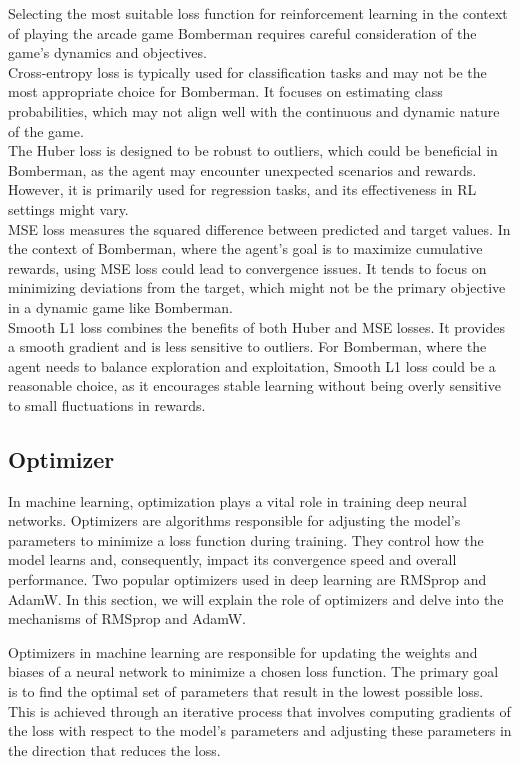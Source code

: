 Selecting the most suitable loss function for reinforcement learning in the context of playing the arcade game Bomberman requires careful consideration of the game's dynamics and objectives.\\
Cross-entropy loss is typically used for classification tasks and may not be the most appropriate choice for Bomberman. It focuses on estimating class probabilities, which may not align well with the continuous and dynamic nature of the game. \\
The Huber loss is designed to be robust to outliers, which could be beneficial in Bomberman, as the agent may encounter unexpected scenarios and rewards. However, it is primarily used for regression tasks, and its effectiveness in RL settings might vary. \\
MSE loss measures the squared difference between predicted and target values. In the context of Bomberman, where the agent's goal is to maximize cumulative rewards, using MSE loss could lead to convergence issues. It tends to focus on minimizing deviations from the target, which might not be the primary objective in a dynamic game like Bomberman. \\
Smooth L1 loss combines the benefits of both Huber and MSE losses. It provides a smooth gradient and is less sensitive to outliers. For Bomberman, where the agent needs to balance exploration and exploitation, Smooth L1 loss could be a reasonable choice, as it encourages stable learning without being overly sensitive to small fluctuations in rewards.

\subsection{Optimizer}

In machine learning, optimization plays a vital role in training deep neural networks. Optimizers are algorithms responsible for adjusting the model's parameters to minimize a loss function during training. They control how the model learns and, consequently, impact its convergence speed and overall performance. Two popular optimizers used in deep learning are RMSprop and AdamW. In this section, we will explain the role of optimizers and delve into the mechanisms of RMSprop and AdamW.

Optimizers in machine learning are responsible for updating the weights and biases of a neural network to minimize a chosen loss function. The primary goal is to find the optimal set of parameters that result in the lowest possible loss. This is achieved through an iterative process that involves computing gradients of the loss with respect to the model's parameters and adjusting these parameters in the direction that reduces the loss.

